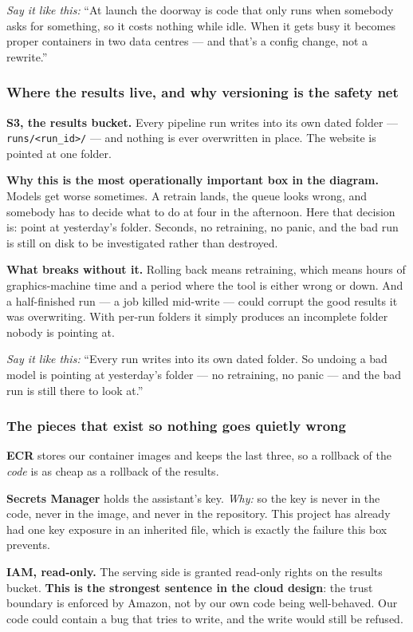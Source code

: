 \documentclass[11pt,a4paper]{article}
\newcommand{\code}[1]{\texttt{\small #1}}
\newcommand{\aloud}[1]{\par\smallskip\noindent\textit{\textcolor{accent}{Say
it like this:}} ``#1''\par\smallskip}
\begin{document}
\aloud{At launch the doorway is code that only runs when somebody asks for
something, so it costs nothing while idle. When it gets busy it becomes proper
containers in two data centres --- and that's a config change, not a rewrite.}

\subsubsection*{Where the results live, and why versioning is the safety net}

\textbf{S3, the results bucket.} Every pipeline run writes into its own dated
folder --- \code{runs/<run\_id>/} --- and nothing is ever overwritten in place.
The website is pointed at one folder.

\textbf{Why this is the most operationally important box in the diagram.}
Models get worse sometimes. A retrain lands, the queue looks wrong, and
somebody has to decide what to do at four in the afternoon. Here that decision
is: point at yesterday's folder. Seconds, no retraining, no panic, and the bad
run is still on disk to be investigated rather than destroyed.

\textbf{What breaks without it.} Rolling back means retraining, which means
hours of graphics-machine time and a period where the tool is either wrong or
down. And a half-finished run --- a job killed mid-write --- could corrupt the
good results it was overwriting. With per-run folders it simply produces an
incomplete folder nobody is pointing at.

\aloud{Every run writes into its own dated folder. So undoing a bad model is
pointing at yesterday's folder --- no retraining, no panic --- and the bad run
is still there to look at.}

\subsubsection*{The pieces that exist so nothing goes quietly wrong}

\textbf{ECR} stores our container images and keeps the last three, so a
rollback of the \emph{code} is as cheap as a rollback of the results.

\textbf{Secrets Manager} holds the assistant's key. \emph{Why:} so the key is
never in the code, never in the image, and never in the repository. This project
has already had one key exposure in an inherited file, which is exactly the
failure this box prevents.

\textbf{IAM, read-only.} The serving side is granted read-only rights on the
results bucket. \textbf{This is the strongest sentence in the cloud design}: the
trust boundary is enforced by Amazon, not by our own code being well-behaved.
Our code could contain a bug that tries to write, and the write would still be
refused.
\end{document}

